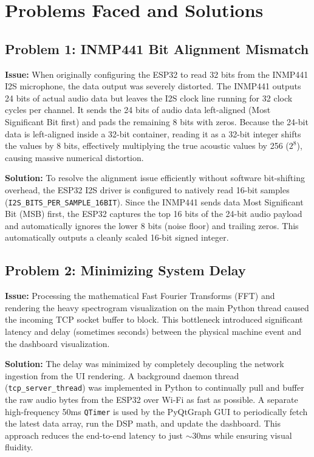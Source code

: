 \documentclass[11pt,a4paper]{article}
\begin{document}
\section{Problems Faced and Solutions}

\subsection{Problem 1: INMP441 Bit Alignment Mismatch}
\textbf{Issue:} When originally configuring the ESP32 to read 32 bits from the INMP441 I2S microphone, the data output was severely distorted. The INMP441 outputs 24 bits of actual audio data but leaves the I2S clock line running for 32 clock cycles per channel. It sends the 24 bits of audio data left-aligned (Most Significant Bit first) and pads the remaining 8 bits with zeros. Because the 24-bit data is left-aligned inside a 32-bit container, reading it as a 32-bit integer shifts the values by 8 bits, effectively multiplying the true acoustic values by 256 ($2^8$), causing massive numerical distortion.

\textbf{Solution:} To resolve the alignment issue efficiently without software bit-shifting overhead, the ESP32 I2S driver is configured to natively read 16-bit samples (\texttt{I2S\_BITS\_PER\_SAMPLE\_16BIT}). Since the INMP441 sends data Most Significant Bit (MSB) first, the ESP32 captures the top 16 bits of the 24-bit audio payload and automatically ignores the lower 8 bits (noise floor) and trailing zeros. This automatically outputs a cleanly scaled 16-bit signed integer.

\subsection{Problem 2: Minimizing System Delay}
\textbf{Issue:} Processing the mathematical Fast Fourier Transforms (FFT) and rendering the heavy spectrogram visualization on the main Python thread caused the incoming TCP socket buffer to block. This bottleneck introduced significant latency and delay (sometimes seconds) between the physical machine event and the dashboard visualization.

\textbf{Solution:} The delay was minimized by completely decoupling the network ingestion from the UI rendering. A background daemon thread (\texttt{tcp\_server\_thread}) was implemented in Python to continually pull and buffer the raw audio bytes from the ESP32 over Wi-Fi as fast as possible. A separate high-frequency 50ms \texttt{QTimer} is used by the PyQtGraph GUI to periodically fetch the latest data array, run the DSP math, and update the dashboard. This approach reduces the end-to-end latency to just $\sim$30ms while ensuring visual fluidity.
\end{document}

